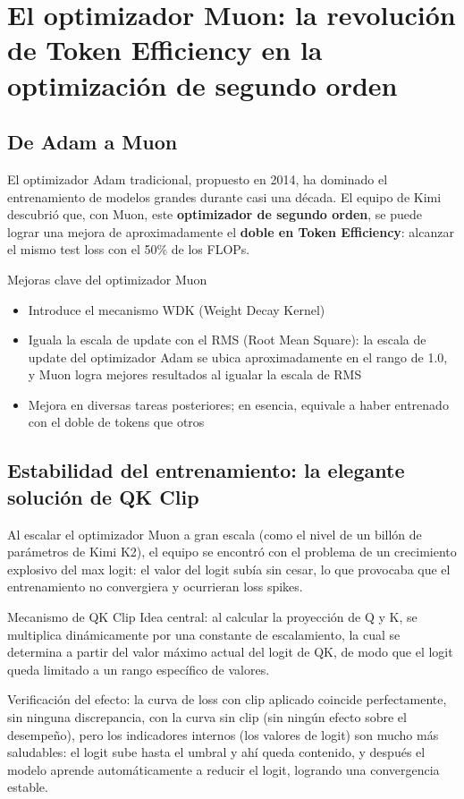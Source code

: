 \section{El optimizador Muon: la revolución de Token Efficiency en la optimización de segundo orden}

\subsection{De Adam a Muon}

El optimizador Adam tradicional, propuesto en 2014, ha dominado el entrenamiento de modelos grandes durante casi una década. El equipo de Kimi descubrió que, con Muon, este \textbf{optimizador de segundo orden}, se puede lograr una mejora de aproximadamente el \textbf{doble en Token Efficiency}: alcanzar el mismo test loss con el 50\% de los FLOPs.

\begin{importantbox}{Mejoras clave del optimizador Muon}
\begin{itemize}
\item Introduce el mecanismo WDK (Weight Decay Kernel)
\item Iguala la escala de update con el RMS (Root Mean Square): la escala de update del optimizador Adam se ubica aproximadamente en el rango de 1.0, y Muon logra mejores resultados al igualar la escala de RMS
\item Mejora en diversas tareas posteriores; en esencia, equivale a haber entrenado con el doble de tokens que otros
\end{itemize}
\end{importantbox}

\subsection{Estabilidad del entrenamiento: la elegante solución de QK Clip}

Al escalar el optimizador Muon a gran escala (como el nivel de un billón de parámetros de Kimi K2), el equipo se encontró con el problema de un crecimiento explosivo del max logit: el valor del logit subía sin cesar, lo que provocaba que el entrenamiento no convergiera y ocurrieran loss spikes.

\begin{knowledgebox}{Mecanismo de QK Clip}
Idea central: al calcular la proyección de Q y K, se multiplica dinámicamente por una constante de escalamiento, la cual se determina a partir del valor máximo actual del logit de QK, de modo que el logit queda limitado a un rango específico de valores.

Verificación del efecto: la curva de loss con clip aplicado coincide perfectamente, sin ninguna discrepancia, con la curva sin clip (sin ningún efecto sobre el desempeño), pero los indicadores internos (los valores de logit) son mucho más saludables: el logit sube hasta el umbral y ahí queda contenido, y después el modelo aprende automáticamente a reducir el logit, logrando una convergencia estable.
\end{knowledgebox}

